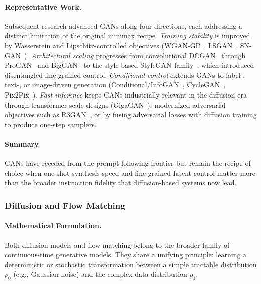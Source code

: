 \documentclass{llmxive}
\begin{document}
\paragraph{Representative Work.}
Subsequent research advanced GANs along four directions, each addressing a distinct limitation of the original minimax recipe. \emph{Training stability} is improved by Wasserstein and Lipschitz-controlled objectives (WGAN-GP~\citep{gulrajani2017improvedtrainingwassersteingans}, LSGAN~\citep{mao2017squaresgenerativeadversarialnetworks}, SN-GAN~\citep{miyato2018spectralnormalizationgenerativeadversarial}). \emph{Architectural scaling} progresses from convolutional DCGAN~\citep{radford2016unsupervisedrepresentationlearningdeep} through ProGAN~\citep{salimans2022progressive} and BigGAN~\citep{brock2019largescalegantraining} to the style-based StyleGAN family~\citep{karras2019stylebasedgeneratorarchitecturegenerative}, which introduced disentangled fine-grained control. \emph{Conditional control} extends GANs to label-, text-, or image-driven generation (Conditional/InfoGAN~\citep{chen2016infoganinterpretablerepresentationlearning}, CycleGAN~\citep{zhu2020unpairedimagetoimagetranslationusing}, Pix2Pix~\citep{isola2017image}). \emph{Fast inference} keeps GANs industrially relevant in the diffusion era through transformer-scale designs (GigaGAN~\citep{kang2023gigagan}), modernized adversarial objectives such as R3GAN~\citep{huang2025r3gan}, or by fusing adversarial losses with diffusion training to produce one-step samplers.

\paragraph{Summary.}
GANs have receded from the prompt-following frontier but remain the recipe of choice when one-shot synthesis speed and fine-grained latent control matter more than the broader instruction fidelity that diffusion-based systems now lead.

\subsubsection{Diffusion and Flow Matching}

\paragraph{Mathematical Formulation.}
Both diffusion models and flow matching belong to the broader family of continuous-time generative models. They share a unifying principle: learning a deterministic or stochastic transformation between a simple tractable distribution $p_0$ (e.g., Gaussian noise) and the complex data distribution $p_1$.
\end{document}
